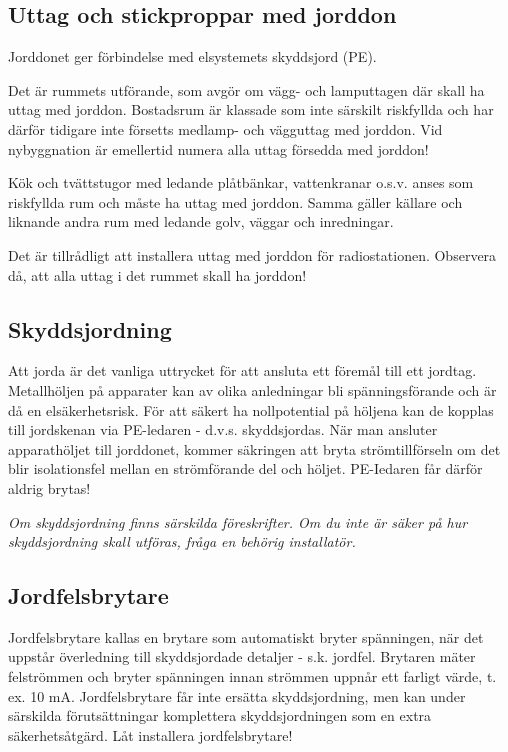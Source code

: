 \subsection{Uttag och stickproppar med jorddon}

Jorddonet ger förbindelse med elsystemets skyddsjord (PE).

Det är rummets utförande, som avgör om vägg- och lamputtagen där skall
ha uttag med jorddon. Bostadsrum är klassade som inte särskilt
riskfyllda och har därför tidigare inte försetts medlamp- och
vägguttag med jorddon. Vid nybyggnation är emellertid numera alla
uttag försedda med jorddon!

Kök och tvättstugor med ledande plåtbänkar, vattenkranar o.s.v. anses
som riskfyllda rum och måste ha uttag med jorddon.  Samma gäller
källare och liknande andra rum med ledande golv, väggar och
inredningar.

Det är tillrådligt att installera uttag med jorddon för
radiostationen. Observera då, att alla uttag i det rummet skall ha
jorddon!

\subsection{Skyddsjordning}

Att jorda är det vanliga uttrycket för att ansluta ett föremål till
ett jordtag. Metallhöljen på apparater kan av olika anledningar bli
spänningsförande och är då en elsäkerhetsrisk. För att säkert ha
nollpotential på höljena kan de kopplas till jordskenan via
PE-ledaren - d.v.s. skyddsjordas. När man ansluter apparathöljet till
jorddonet, kommer säkringen att bryta strömtillförseln om det blir
isolationsfel mellan en strömförande del och höljet. PE-Iedaren får
därför aldrig brytas!

\emph{Om skyddsjordning finns särskilda föreskrifter. Om du inte är
  säker på hur skyddsjordning skall utföras, fråga en behörig
  installatör.}

\subsection{Jordfelsbrytare}

Jordfelsbrytare kallas en brytare som automatiskt bryter spänningen,
när det uppstår överledning till skyddsjordade detaljer -
s.k. jordfel.  Brytaren mäter felströmmen och bryter spänningen innan
strömmen uppnår ett farligt värde, t. ex. 10 mA. Jordfelsbrytare får
inte ersätta skyddsjordning, men kan under särskilda förutsättningar
komplettera skyddsjordningen som en extra säkerhetsåtgärd. Låt
installera jordfelsbrytare!


